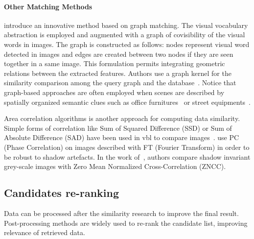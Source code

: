 		\paragraph{Other Matching Methods}
	        \citet{Stumm2015a} introduce an innovative method based on graph matching. The visual vocabulary abstraction is employed and augmented with a graph of covisibility of the visual words in images. The graph is constructed as follows: nodes represent visual word detected in images and edges are created between two nodes if they are seen together in a same image. This formulation permits integrating geometric relations between the extracted features. Authors use a graph kernel for the similarity comparison among the query graph and the database~\citep{Stumm2015,Stumm2016}. Notice that graph-based approaches are often employed when scenes are described by spatially organized semantic clues such as office furnitures~\citep{Salas-Moreno2013} or street equipments~\citep{Ardeshir2014}.
        
    	    Area correlation algorithms is another approach for computing data similarity. Simple forms of correlation like Sum of Squared Difference (SSD) or Sum of Absolute Difference (SAD) have been used in \ac{vbl} to compare images~\citep{Poglitsch2015,Milford2015}. \citet{Wan2016} use PC (Phase Correlation) on images described with FT (Fourier Transform) in order to be robust to shadow artefacts. In the work of~\citep{Corke2013}, authors compare shadow invariant grey-scale images with Zero Mean Normalized Cross-Correlation (ZNCC).
        
		
	\subsection{Candidates re-ranking}
	\label{subsec:candidates_re_ranking}
		Data can be processed after the similarity research to improve the final result. Post-processing methods are widely used to re-rank the candidate list, improving relevance of retrieved data.
        		
